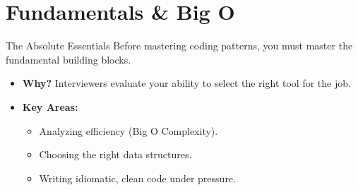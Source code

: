 \section{Fundamentals \& Big O}

\begin{frame}[c]{\empty}
    \begin{center}
        \Large\textbf{\secname}
    \end{center}
\end{frame}

\begin{frame}{The Absolute Essentials}
  Before mastering coding patterns, you must master the fundamental building blocks.
  \begin{itemize}
    \item \textbf{Why?} Interviewers evaluate your ability to select the right tool for the job.
    \item \textbf{Key Areas:}
      \begin{itemize}
        \item Analyzing efficiency (Big O Complexity).
        \item Choosing the right data structures.
        \item Writing idiomatic, clean code under pressure.
      \end{itemize}
  \end{itemize}
\end{frame}


